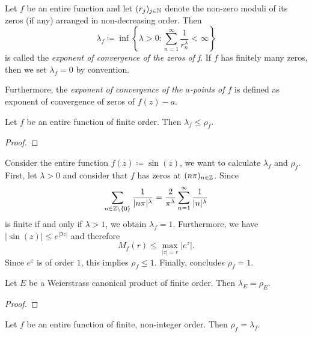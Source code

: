 \begin{definition}
    Let $f$ be an entire function and let $(r_j)_{j \in \mathbb{N}}$ denote the non-zero moduli of its zeros (if any) arranged in non-decreasing order. Then
    $$ \lambda_f \coloneqq \inf \left\{ \lambda > 0 : \sum_{n=1}^\infty \frac{1}{r^\lambda_n} < \infty \right\} $$
    is called the \emph{exponent of convergence of the zeros of f}. If $f$ has finitely many zeros, then we set $\lambda_f = 0$ by convention.

    Furthermore, the \emph{exponent of convergence of the $a$-points of $f$} is defined as exponent of convergence of zeros of $f(z) - a$.
\end{definition}

\begin{theorem} \label{thm:inequality-order-exponent-of-convergence}
    Let $f$ be an entire function of finite order. Then $\lambda_f \leq \rho_f$.
\end{theorem}

\begin{proof}
\end{proof}

\begin{example} \label{exm:exponent-of-convergence}
    Consider the entire function $f(z) \coloneqq \sin(z)$, we want to calculate $\lambda_f$ and $\rho_f$. First, let $\lambda > 0$ and consider that $f$ has zeros at $(n \pi)_{n \in \mathbb{Z}}$. Since
    $$ \sum_{n \in \mathbb{Z} \setminus \{0\}} \frac{1}{\vert n \pi \vert^\lambda} = \frac{2}{\pi^\lambda} \sum_{n=1}^\infty \frac{1}{\vert n \vert^\lambda} $$
    is finite if and only if $\lambda > 1$, we obtain $\lambda_f = 1$. Furthermore, we have $\vert \sin(z) \vert \leq e^{\vert \Im z \vert}$
    and therefore
    $$ M_f(r) \leq \max_{\vert z \vert = r} \vert e^z \vert. $$
    Since $e^z$ is of order $1$, this implies $\rho_f \leq 1$. Finally,  concludes $\rho_f = 1$.
\end{example}

\begin{theorem} \label{thm:exponent-of-convergence-weierstrass-product}
    Let $E$ be a Weierstrass canonical product of finite order. Then $\lambda_E = \rho_E$.
\end{theorem}

\begin{proof}
\end{proof}

\begin{theorem} \label{thm:finite-non-integer-order-equals-exponent-of-convergence}
    Let $f$ be an entire function of finite, non-integer order. Then $\rho_f = \lambda_f$.
\end{theorem}

